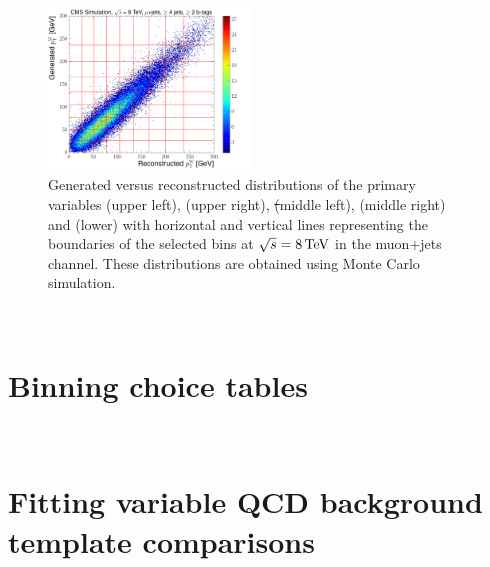 \begin{figure}[hbtp]
	 \includegraphics[width=0.48\textwidth]{Chapters/04_Analysis/04b_XSections/images/binning/muon_WPT_8TeV.pdf}\hfill
	 \caption{Generated versus reconstructed distributions of the primary variables \met (upper left), \HT (upper
	 right), \st (middle left), \mt (middle right) and \wpt (lower) with horizontal and vertical lines
	 representing the boundaries of the selected bins at $\sqrt{s}=8\,\text{Te\hspace{-.08em}V}$ in the muon+jets channel. These
	 distributions are obtained using \ttbar Monte Carlo simulation.}
     \label{fig:binning_8TeV_muon}
 \end{figure}
 

~\section*{Binning choice tables}
\label{as:binning_tables_electron}





 
~\section*{Fitting variable QCD background template comparisons}
\label{as:fitting_variable_QCD_template_comparisons}

